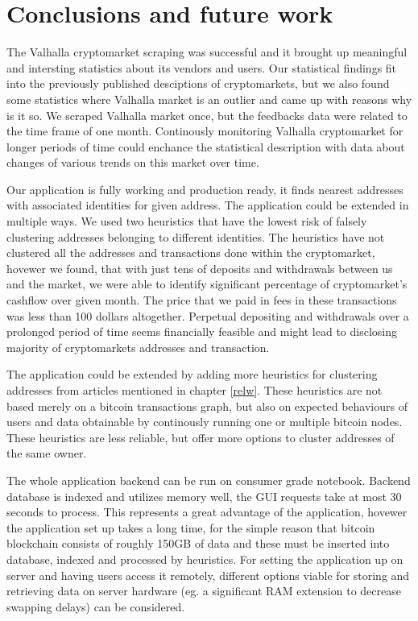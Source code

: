 \documentclass[
  digital, %
  table,   %
  lof,     %
  lot,     %
  oneside
]{fithesis3}
\begin{document}
\chapter{Conclusions and future work}

The Valhalla cryptomarket scraping was successful and
it brought up meaningful and intersting statistics about its vendors and users.
Our statistical findings fit into the previously published desciptions
of cryptomarkets, but we also found some statistics where Valhalla market is an outlier and
came up with reasons why is it so.
We scraped Valhalla market once, but the feedbacks data were
related to the time frame of one month. Continously monitoring 
Valhalla cryptomarket for longer periods of time could enchance the statistical description
with data about changes of various trends on this market over time.

Our application is fully working and production ready, it 
finds nearest addresses with associated identities for given address.
The application could be extended in multiple ways. We used two
heuristics that have the lowest risk of falsely clustering addresses belonging to different identities.
The heuristics have not clustered all the addresses and transactions done within the cryptomarket,
hovewer we found, that with just tens of deposits and withdrawals between us and the market,
we were able to identify significant percentage of cryptomarket's cashflow over given month.
The price that we paid in fees in these transactions was less than 100 dollars altogether. 
Perpetual depositing and withdrawals over a prolonged period of time seems financially feasible
and might lead to disclosing majority of cryptomarkets addresses and transaction.

The application could be extended by adding more heuristics for clustering addresses from articles mentioned
in chapter \ref{relw}.
These heuristics are not based merely on a bitcoin transactions graph, but also
on expected behaviours of users and data obtainable by continously running one or multiple
bitcoin nodes. These heuristics are less reliable, but offer more options to cluster addresses of the same owner.

The whole application backend can be run on consumer grade notebook. Backend database is indexed and utilizes memory well,
the GUI requests take at most 30 seconds to process. This represents a great advantage of the application,
hovewer the application set up takes a long time, for the simple reason that bitcoin
blockchain consists of roughly 150GB of data and these must be inserted into database, indexed
and processed by heuristics.
For setting the application up on server and having users access it remotely,
different options viable for storing and retrieving data on server hardware
(eg. a significant RAM extension to decrease swapping delays) can be considered.

\printbibliography{}
\end{document}

